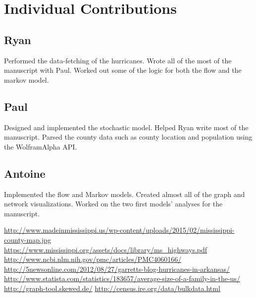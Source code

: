 \documentclass[titlepage]{article}
\begin{document}
\section{Individual Contributions}
\label{sec:contributions}
\subsection*{Ryan}
Performed the data-fetching of the hurricanes. Wrote all of the most of the manuscript with Paul. Worked out some of the logic for both the flow and the markov model.

\subsection*{Paul}
Designed and implemented the stochastic model. Helped Ryan write most of the manuscript. Parsed the county data such as county location and population using the WolframAlpha API. 

\subsection*{Antoine}
Implemented the flow and Markov models. Created almost all of the graph and network visualizations. Worked on the two first models' analyses for the manuscript.

  \begin{thebibliography}{9}
      \url{http://www.madeinmississippi.us/wp-content/uploads/2015/02/mississippi-county-map.jpg}
      \url{https://www.mississippi.org/assets/docs/library/ms_highways.pdf}
      \url{http://www.ncbi.nlm.nih.gov/pmc/articles/PMC4060166/}
      \url{http://5newsonline.com/2012/08/27/garretts-blog-hurricanes-in-arkansas/}
      \url{http://www.statista.com/statistics/183657/average-size-of-a-family-in-the-us/}
      \url{http://graph-tool.skewed.de/}
      \url{http://census.ire.org/data/bulkdata.html}
  \end{thebibliography}
\end{document}
